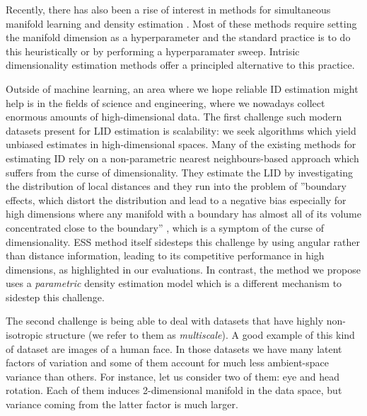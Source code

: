 Recently, there has also been a rise of interest in methods for simultaneous manifold learning and density estimation \citep{brehmer2020flowsa,caterini2021rectangular,ross2021tractable}.
Most of these methods require setting the manifold dimension as a hyperparameter and the standard practice is to do this heuristically or by performing a hyperparamater sweep.
Intrisic dimensionality estimation methods offer a principled alternative to this practice.


Outside of machine learning, an area where we hope reliable ID estimation might help is in the fields of science and engineering, where we nowadays collect enormous amounts of high-dimensional data.
The first challenge such modern datasets present for LID estimation is scalability: we seek algorithms which yield unbiased estimates in high-dimensional spaces.
Many of the existing methods for estimating ID rely on a non-parametric nearest neighbours-based approach which suffers from the curse of dimensionality.
They estimate the LID by investigating the distribution of local distances and they run into the problem of ''boundary effects, which distort the distribution and lead to a negative bias especially for high dimensions where any manifold with a boundary has almost all of its volume concentrated close to the boundary'' \citep{johnsson2014low}, which is a symptom of the curse of dimensionality.
ESS method \citep{johnsson2014low} itself sidesteps this challenge by using angular rather than distance information, leading to its competitive performance in high dimensions, as highlighted in our evaluations.
In contrast, the method we propose uses a \emph{parametric} density estimation model which is a different mechanism to sidestep this challenge.

The second challenge is being able to deal with datasets that have highly non-isotropic structure 
(we refer to them as \emph{multiscale}). 
A good example of this kind of dataset are images of a human face.
In those datasets we have many latent factors of variation and some of them account for much less ambient-space variance than others. 
For instance, let us consider two of them: eye and head rotation.
Each of them induces 2-dimensional manifold in the data space, but variance coming from the latter factor is much larger. 

